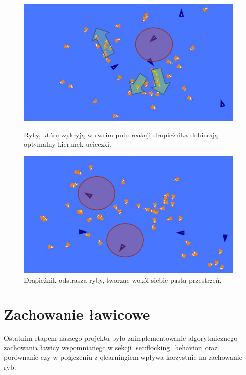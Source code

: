 \documentclass{article}
\begin{document}
\begin{figure}[H]
    \begin{minipage}{0.48\textwidth}
        \centering
        \includegraphics[width=\textwidth]{boid_opposite_direction.png}
        \caption{Ryby, które wykryją w swoim polu reakcji drapieżnika dobierają optymalny kierunek ucieczki.}
    \end{minipage}
    \hspace{0.02\textwidth}
    \begin{minipage}{0.48\textwidth}
        \centering
        \includegraphics[width=\textwidth]{fish_fleeing.png}
        \caption{Drapieżnik odstrasza ryby, tworząc wokól siebie pustą przestrzeń.}
    \end{minipage}
\end{figure}
\section{Zachowanie ławicowe}
Ostatnim etapem naszego projektu było zaimplementowanie algorytmicznego zachowania ławicy wspomnianego w sekcji \ref{sec:flocking_behavior} oraz porównanie czy w połączeniu z qlearningiem wpływa korzystnie na zachowanie ryb.
\end{document}
